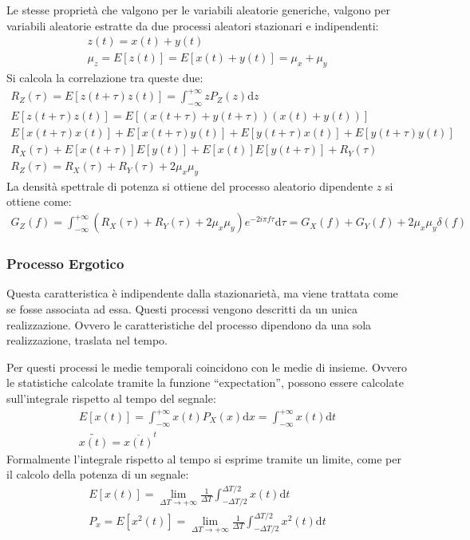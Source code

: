 \documentclass{article}
\newcommand{\df}{\mathrm{d}}
\numberwithin{equation}{subsection}
\begin{document}
Le stesse proprietà che valgono per le variabili aleatorie generiche, valgono per variabili aleatorie estratte da due processi aleatori stazionari e indipendenti:
\begin{gather*}
    z(t)=x(t)+y(t)\\
    \mu_z=E[z(t)]=E[x(t)+y(t)]=\mu_x+\mu_y
\end{gather*}
Si calcola la correlazione tra queste due:
\begin{gather*}
    R_Z(\tau)=E[z(t+\tau)z(t)]=\displaystyle\int_{-\infty}^{+\infty}zP_Z(z)\df z\\
    E[z(t+\tau)z(t)]=E[(x(t+\tau)+y(t+\tau))(x(t)+y(t))]\\
    E[x(t+\tau)x(t)]+E[x(t+\tau)y(t)]+E[y(t+\tau)x(t)]+E[y(t+\tau)y(t)]\\
    R_X(\tau)+E[x(t+\tau)]E[y(t)]+E[x(t)]E[y(t+\tau)]+R_Y(\tau)\\
    R_Z(\tau)=R_X(\tau)+R_Y(\tau)+2\mu_x\mu_y
\end{gather*}
La densità spettrale di potenza si ottiene del processo aleatorio dipendente $z$ si ottiene come:
\begin{gather*}
    G_Z(f)=\int_{-\infty}^{+\infty}\left(R_X(\tau)+R_Y(\tau)+2\mu_x\mu_y\right)e^{-2i\pi f\tau}\df \tau=G_X(f)+G_Y(f)+2\mu_x\mu_y\delta(f)
\end{gather*}

\subsubsection{Processo Ergotico}

Questa caratteristica è indipendente dalla stazionarietà, ma viene trattata come se fosse associata ad essa. 
Questi processi vengono descritti da un unica realizzazione. Ovvero le caratteristiche del processo dipendono da una sola realizzazione, traslata nel tempo. 

Per questi processi le medie temporali coincidono con le medie di insieme. Ovvero le statistiche calcolate tramite la funzione ``expectation'', possono essere 
calcolate sull'integrale rispetto al tempo del segnale:
\begin{gather*}
    E[x(t)]=\displaystyle\int_{-\infty}^{+\infty}x(t)P_X(x)\df x=\int_{-\infty}^{+\infty}x(t)\df t\\
    \widetilde{x(t)}=\overline{x(t)}^t
\end{gather*}
Formalmente l'integrale rispetto al tempo si esprime tramite un limite, come per il calcolo della potenza di un segnale:
\begin{gather*}
    E[x(t)]=\lim_{\Delta T\to+\infty}\displaystyle\frac{1}{\Delta T}\int_{-\Delta T/2}^{\Delta T/2}x(t)\df t\\
    P_x=E[x^2(t)]=\lim_{\Delta T\to+\infty}\displaystyle\frac{1}{\Delta T}\int_{-\Delta T/2}^{\Delta T/2}x^2(t)\df t
\end{gather*}
\end{document}
